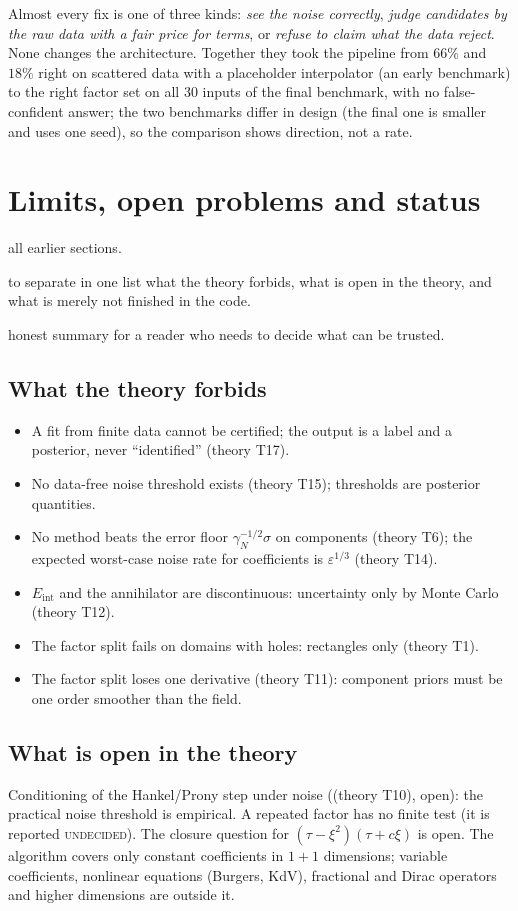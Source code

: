 \documentclass[11pt,a4paper]{article}
\theoremstyle{definition}
\newcommand{\sectionbrief}[3]{\begin{leadin}\begin{description}[nosep,leftmargin=3.0cm,labelwidth=2.8cm]
  \item[Starting from] #1
  \item[Why this section] #2
  \item[Role in the paper] #3
  \end{description}\end{leadin}}
\newcommand{\Eint}{E_{\mathrm{int}}}
\newcommand{\thy}[1]{\textcolor{cG}{\textsf{\footnotesize(theory #1)}}}
\begin{document}
\begin{takeaway}
Almost every fix is one of three kinds: \emph{see the noise correctly}, \emph{judge candidates by the raw data with a fair price for terms}, or \emph{refuse to claim what the data reject}. None changes the architecture. Together they took the pipeline from $66\%$ and $18\%$ right on scattered data with a placeholder interpolator (an early benchmark) to the right factor set on all $30$ inputs of the final benchmark, with no false-confident answer; the two benchmarks differ in design (the final one is smaller and uses one seed), so the comparison shows direction, not a rate.
\end{takeaway}



\section{Limits, open problems and status}\label{sec:limits}
\sectionbrief
{all earlier sections.}
{to separate in one list what the theory forbids, what is open in the theory, and what is merely not finished in the code.}
{honest summary for a reader who needs to decide what can be trusted.}

\subsection{What the theory forbids}
\begin{itemize}[nosep]
\item A fit from finite data cannot be certified; the output is a label and a posterior, never ``identified'' \thy{T17}.
\item No data-free noise threshold exists \thy{T15}; thresholds are posterior quantities.
\item No method beats the error floor $\gamma_N^{-1/2}\sigma$ on components \thy{T6}; the expected worst-case noise rate for coefficients is $\varepsilon^{1/3}$ \thy{T14}.
\item $\Eint$ and the annihilator are discontinuous: uncertainty only by Monte Carlo \thy{T12}.
\item The factor split fails on domains with holes: rectangles only \thy{T1}.
\item The factor split loses one derivative \thy{T11}: component priors must be one order smoother than the field.
\end{itemize}

\subsection{What is open in the theory}
Conditioning of the Hankel/Prony step under noise (\thy{T10}, open): the practical noise threshold is empirical. A repeated factor has no finite test (it is reported \textsc{undecided}). The closure question for $(\tau-\xi^2)(\tau+c\xi)$ is open. The algorithm covers only constant coefficients in $1+1$ dimensions; variable coefficients, nonlinear equations (Burgers, KdV), fractional and Dirac operators and higher dimensions are outside it.
\end{document}
